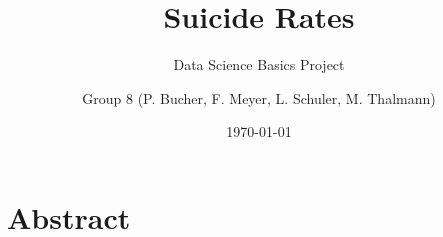 \author{Group 8 (P. Bucher, F. Meyer, L. Schuler, M. Thalmann)}
\title{Suicide Rates}
\subtitle{Data Science Basics Project}
\date{\today}
\maketitle

\section*{Abstract}
